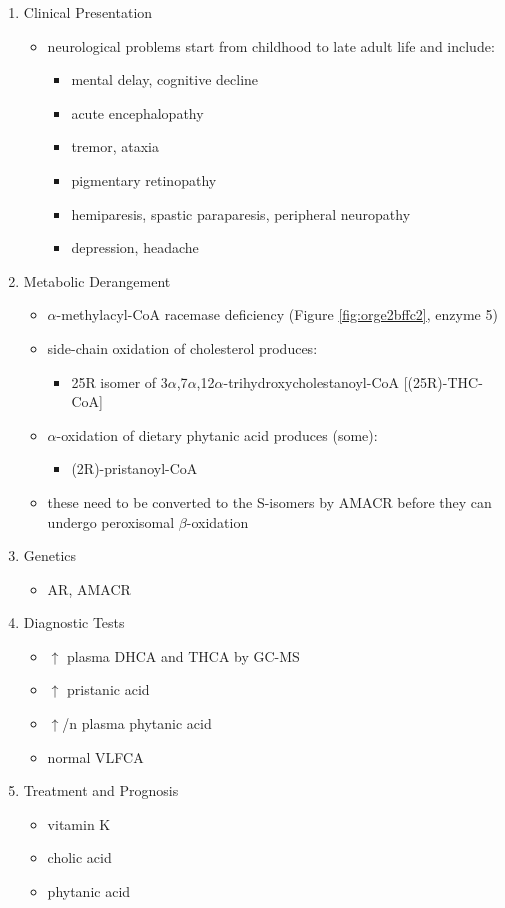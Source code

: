 \documentclass{scrartcl}
\begin{document}
\begin{enumerate}
\item Clinical Presentation
\label{sec:orgddf803a}
\begin{itemize}
\item neurological problems start from childhood to late adult life and
include:
\begin{itemize}
\item mental delay, cognitive decline
\item acute encephalopathy
\item tremor, ataxia
\item pigmentary retinopathy
\item hemiparesis, spastic paraparesis, peripheral neuropathy
\item depression, headache
\end{itemize}
\end{itemize}

\item Metabolic Derangement
\label{sec:org2e6dc52}
\begin{itemize}
\item \(\alpha\)-methylacyl-CoA racemase deficiency (Figure \ref{fig:orge2bffc2}, enzyme 5)
\item side-chain oxidation of cholesterol produces:
\begin{itemize}
\item 25R isomer of 3\(\alpha\),7\(\alpha\),12\(\alpha\)-trihydroxycholestanoyl-CoA [(25R)-THC-CoA]
\end{itemize}
\item \(\alpha\)-oxidation of dietary phytanic acid produces (some):
\begin{itemize}
\item (2R)-pristanoyl-CoA
\end{itemize}
\item these need to be converted to the S-isomers by AMACR before they can
undergo peroxisomal \(\beta\)-oxidation
\end{itemize}

\item Genetics
\label{sec:orgc0c6e61}
\begin{itemize}
\item AR, AMACR
\end{itemize}

\item Diagnostic Tests
\label{sec:org2d02332}
\begin{itemize}
\item \(\uparrow\) plasma DHCA and THCA by GC-MS
\item \(\uparrow\) pristanic acid
\item \(\uparrow\)/n plasma phytanic acid
\item normal VLFCA
\end{itemize}

\item Treatment and Prognosis
\label{sec:org25a748a}
\begin{itemize}
\item vitamin K
\item cholic acid
\item phytanic acid
\end{itemize}
\end{enumerate}
\end{document}
